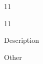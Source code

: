 \documentclass[paper=A4]{ropas-poster}
\begin{document}
\begin{postergrid}{1}{1}
\begin{posterblock}{1}{1}
\begin{description}\item[Name] Description\item Other\end{description}
\end{posterblock}
\end{postergrid}
\end{document}
